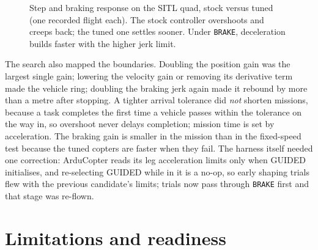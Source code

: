 \documentclass[a4paper,11pt]{article}
\newcommand{\code}[1]{\texttt{\codebreaks#1\endcodebreaks}}
\def\codebreaks{\begingroup\def\_{\textunderscore\allowbreak}\def\/{/\allowbreak}}
\def\endcodebreaks{\endgroup}
\begin{document}
\begin{figure}[t]
\centering
{}
\caption{Step and braking response on the SITL quad, stock versus tuned (one recorded
flight each). The stock controller overshoots and creeps back; the tuned one settles
sooner. Under \code{BRAKE}, deceleration builds faster with the higher jerk limit.}
\label{fig:step}
\end{figure}

The search also mapped the boundaries. Doubling the position gain was the
largest single gain; lowering the velocity gain or removing its derivative
term made the vehicle ring; doubling the braking jerk again made it rebound by
more than a metre after stopping. A tighter arrival tolerance did \emph{not}
shorten missions, because a task completes the first time a vehicle passes
within the tolerance on the way in, so overshoot never delays completion;
mission time is set by acceleration. The braking gain is smaller in the mission
than in the fixed-speed test because the tuned copters are faster when they
fail. The harness itself needed one correction: ArduCopter reads its leg
acceleration limits only when GUIDED initialises, and re-selecting GUIDED while
in it is a no-op, so early shaping trials flew with the previous candidate's
limits; trials now pass through \code{BRAKE} first and that stage was re-flown.

\section{Limitations and readiness}
\end{document}
